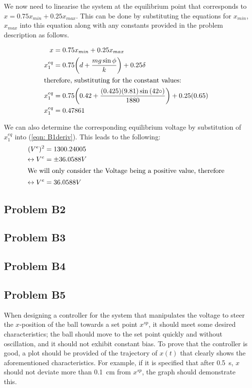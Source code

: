 \documentclass[a4paper,10pt,reqno]{amsart}
\numberwithin{equation}{section}
\begin{document}
We now need to linearise the system at the equilibrium point that corresponds to $x=0.75x_{min}+0.25x_{max}$.
This can be done by substituting the equations for $x_{min}$, $x_{max}$ into this equation along with any constants provided in the problem description as follows.

\begin{align}
x &= 0.75x_{min} + 0.25 x_{max}\nonumber \\
x_1^{eq} &= 0.75 \bigg(d + \frac{mg \sin{\phi}}{k}\bigg) + 0.25 \delta \nonumber \\
\intertext{therefore, substituting for the constant values:}
x_1^{eq} &= 0.75 \bigg(0.42 + \frac{(0.425)(9.81) \sin{(42 \circ)}}{1880}\bigg) + 0.25(0.65) \nonumber \\
x_1^{eq} &= 0.47861 \label{eqn: xvalue}
\end{align}

We can also determine the corresponding equilibrium voltage by substitution of $x_1^{eq}$ into (\ref{eqn: B1deriv}).
This leads to the following:
\begin{align}
(V^e)^2 &= 1300.24005 \nonumber \\
\leftrightarrow V^e &= \pm 36.0588 V \nonumber \\
\intertext{We will only consider the Voltage being a positive value, therefore}
\leftrightarrow V^e &= 36.0588 V \label{eqn: Ve value}
\end{align}



\subsection{Problem B2}\label{sec:b2}


\subsection{Problem B3}\label{sec:b3}


\subsection{Problem B4}\label{sec:b4}




\subsection{Problem B5}\label{sec:b5}

When designing a controller for the system that manipulates the voltage to steer the $x$-position of the ball towards a set point $x^{sp}$, it should meet some desired characteristics; the ball should move to the set point quickly and without oscillation, and it should not exhibit constant bias. To prove that the controller is good, a plot should be provided of the trajectory of $x(t)$ that clearly shows the aforementioned characteristics. For example, if it is specified that after 0.5~s, $x$ should not deviate more than 0.1~cm from $x^{sp}$, the graph should demonstrate this.
\end{document}
